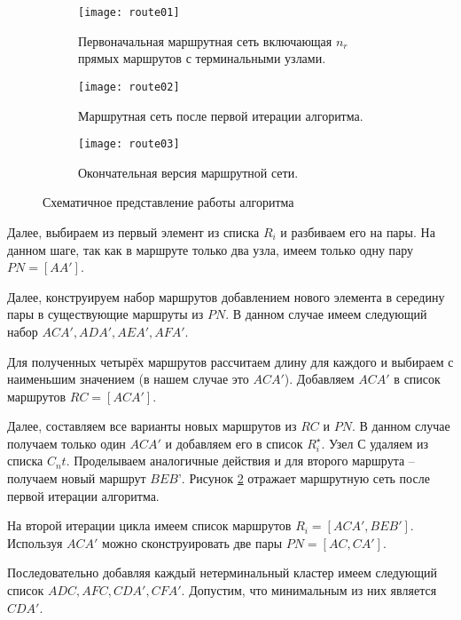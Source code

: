 \begin{figure}[ht!]
    \centering
    \begin{subfigure}{0.3\textwidth}
        \centering
        \texttt{[image: route01]}
        \caption{Первоначальная маршрутная сеть включающая \( n_r \) прямых маршрутов с терминальными узлами.}
        \label{fig:route_first}
    \end{subfigure}
    \begin{subfigure}{0.3\textwidth}
        \centering
        \texttt{[image: route02]}
        \caption{Маршрутная сеть после первой итерации алгоритма.}
        \label{fig:route_second}
    \end{subfigure}
    \begin{subfigure}{0.3\textwidth}
        \centering
        \texttt{[image: route03]}
        \caption{Окончательная версия маршрутной сети.}
        \label{fig:route_third}
    \end{subfigure}
    \caption{Схематичное представление работы алгоритма}
    \label{fig:route}
\end{figure}

Далее, выбираем из первый элемент из списка \( R_i \) и разбиваем его на пары. На данном шаге, так как в 
маршруте только два узла, имеем только одну пару \( PN = [AA'] \).

Далее, конструируем набор маршрутов добавлением нового элемента в середину пары в существующие маршруты из 
\( PN \). В данном случае имеем следующий набор \( ACA', ADA', AEA', AFA' \).

Для полученных четырёх маршрутов рассчитаем длину для каждого и выбираем с наименьшим значением 
(в нашем случае это \( ACA' \)). Добавляем \( ACA' \) в список маршрутов \( RC = [ACA'] \).

Далее, составляем все варианты новых маршрутов из \( RC \) и \( PN \). В данном случае получаем только один 
\( ACA' \) и добавляем его в список \( R^{\star}_{i} \). Узел \( С \) удаляем из списка \( C_nt \).
Проделываем аналогичные действия и для второго маршрута -- получаем новый маршрут \( BEB’ \).
Рисунок \ref{fig:route_second} отражает маршрутную сеть после первой итерации алгоритма.

На второй итерации цикла имеем список маршрутов \( R_i = [ACA', BEB'] \). Используя \( ACA' \) можно 
сконструировать две пары \( PN=[AC, CA'] \).

Последовательно добавляя каждый нетерминальный кластер имеем следующий список \( ADC, AFC, CDA', CFA' \). 
Допустим, что минимальным из них является \( CDA' \).

